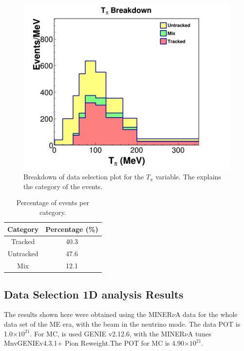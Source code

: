 \begin{figure}
    \centering
    \includegraphics[scale=0.35]{Figures/Chapter4/DataSelection/Stacked_Tpi.png}
    \caption{Breakdown of data selection plot for the $T_\pi$ variable. The explains the category of the events.}
    \label{fig:Analysis:Cuts:DataSelBreakdown}
\end{figure}

\begin{table}[!htb]
    \centering
    \begin{tabular}{c|c}
         Category  & Percentage (\%) \\ \hline
         Tracked   &  40.3 \\
         Untracked &  47.6\\
         Mix       & 12.1
    \end{tabular}
    \caption{Percentage of events per category.}
    \label{tab:Analysis:Cuts:CategoryPercentage}
\end{table}

\subsection{Data Selection 1D analysis Results}
\label{Cap:Analysis:DataSelectionResults1D}

The results shown here were obtained using the MINER$\nu$A data for the whole data set of the ME era, with the beam in the neutrino mode. The data POT is 1.0$\times 10^{21}$. For MC, is used GENIE v2.12.6, with the MINER$\nu$A tunes MnvGENIEv4.3.1+ Pion Reweight.The POT for MC is 4.90$\times 10^{21}$.



